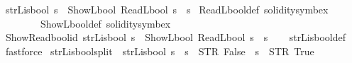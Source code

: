 \begin{isabellebody}
\ {\isacartoucheopen}strL{\isacharunderscore}{\kern0pt}is{\isacharunderscore}{\kern0pt}bool{\isacharprime}{\kern0pt}\ s\ {\isacharequal}{\kern0pt}\ {\isacharparenleft}{\kern0pt}ShowL\isactrlsub b\isactrlsub o\isactrlsub o\isactrlsub l\ {\isacharparenleft}{\kern0pt}ReadL\isactrlsub b\isactrlsub o\isactrlsub o\isactrlsub l\ s{\isacharparenright}{\kern0pt}\ {\isacharequal}{\kern0pt}\ s{\isacharparenright}{\kern0pt}{\isacartoucheclose}\isanewline
\isanewline
{}\isamarkupfalse%
\ ReadL\isactrlsub b\isactrlsub o\isactrlsub o\isactrlsub l{\isacharunderscore}{\kern0pt}def\ {\isacharbrackleft}{\kern0pt}solidity{\isacharunderscore}{\kern0pt}symbex{\isacharbrackright}{\kern0pt}\isanewline
\ \ \ \ \ \ \ \ ShowL\isactrlsub b\isactrlsub o\isactrlsub o\isactrlsub l{\isacharunderscore}{\kern0pt}def\ {\isacharbrackleft}{\kern0pt}solidity{\isacharunderscore}{\kern0pt}symbex{\isacharbrackright}{\kern0pt}\isanewline
\isanewline
\isanewline
{}\isamarkupfalse%
\ Show{\isacharunderscore}{\kern0pt}Read{\isacharunderscore}{\kern0pt}bool{\isacharprime}{\kern0pt}{\isacharunderscore}{\kern0pt}id{\isacharcolon}{\kern0pt}\ {\isacartoucheopen}strL{\isacharunderscore}{\kern0pt}is{\isacharunderscore}{\kern0pt}bool{\isacharprime}{\kern0pt}\ s\ {\isasymLongrightarrow}\ {\isacharparenleft}{\kern0pt}ShowL\isactrlsub b\isactrlsub o\isactrlsub o\isactrlsub l\ {\isacharparenleft}{\kern0pt}ReadL\isactrlsub b\isactrlsub o\isactrlsub o\isactrlsub l\ s{\isacharparenright}{\kern0pt}\ {\isacharequal}{\kern0pt}\ s{\isacharparenright}{\kern0pt}{\isacartoucheclose}\isanewline
%
\isadelimproof
\ \ %
\endisadelimproof
%
\isatagproof
{}\isamarkupfalse%
\ strL{\isacharunderscore}{\kern0pt}is{\isacharunderscore}{\kern0pt}bool{\isacharprime}{\kern0pt}{\isacharunderscore}{\kern0pt}def\ \isamarkupfalse%
\ fastforce%
\endisatagproof
{\isafoldproof}%
%
\isadelimproof
\isanewline
%
\endisadelimproof
\isanewline
{}\isamarkupfalse%
\ strL{\isacharunderscore}{\kern0pt}is{\isacharunderscore}{\kern0pt}bool{\isacharprime}{\kern0pt}{\isacharunderscore}{\kern0pt}split{\isacharcolon}{\kern0pt}\ \ {\isacartoucheopen}strL{\isacharunderscore}{\kern0pt}is{\isacharunderscore}{\kern0pt}bool{\isacharprime}{\kern0pt}\ s\ {\isasymLongrightarrow}\ s\ {\isacharequal}{\kern0pt}\ STR\ {\isacharprime}{\kern0pt}{\isacharprime}{\kern0pt}False{\isacharprime}{\kern0pt}{\isacharprime}{\kern0pt}\ {\isasymor}\ s\ {\isacharequal}{\kern0pt}\ STR\ {\isacharprime}{\kern0pt}{\isacharprime}{\kern0pt}True{\isacharprime}{\kern0pt}{\isacharprime}{\kern0pt}{\isacartoucheclose}\isanewline

\end{isabellebody}
